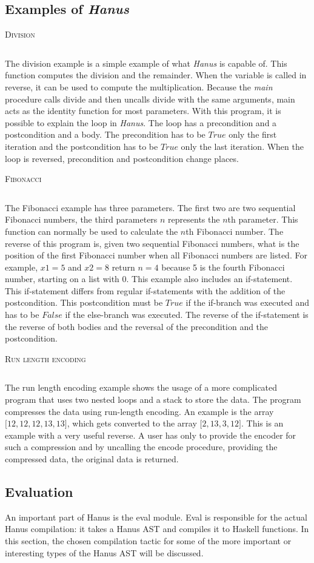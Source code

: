 \documentclass[12pt,a4paper]{article}
\newcommand{\code}[2]{
 \begin{center} \textsc{\small #1} \end{center}
 \inputminted[frame=lines,framesep=.5cm,baselinestretch=.8,linenos,fontsize=\footnotesize]
         {haskell}{code/#2.hs}
}
\begin{document}
\subsection{Examples of \textit{Hanus}}
\code{Division}{divide}
The division example is a simple example of what \textit{Hanus} is capable of. This function computes the division and the remainder. When the variable is called in reverse, it can be used to compute the multiplication. Because the \textit{main} procedure calls divide and then uncalls divide with the same arguments, main acts as the identity function for most parameters. With this program, it is possible to explain the loop in \textit{Hanus}. The loop has a precondition and a postcondition and a body. The precondition has to be $True$ only the first iteration and the postcondition has to be $True$ only the last iteration. When the loop is reversed, precondition and postcondition change places. 
    
\code{Fibonacci}{fibonacci}
The Fibonacci example has three parameters. The first two are two sequential Fibonacci numbers, the third parameters $n$ represents the $n$th parameter. This function can normally be used to calculate the $n$th Fibonacci number. The reverse of this program is, given two sequential Fibonacci numbers, what is the position of the first Fibonacci number when all Fibonacci numbers are listed. For example, $x1 = 5$ and $x2 = 8$ return $n=4$ because 5 is the fourth Fibonacci number, starting on a list with 0. This example also includes an if-statement. This if-statement differs from regular if-statements with the addition of the postcondition. This postcondition must be $True$ if the if-branch was executed and has to be $False$ if the else-branch was executed. The reverse of the if-statement is the reverse of both bodies and the reversal of the precondition and the postcondition.
\code{Run length encoding}{run-length-encoding}
The run length encoding example shows the usage of a more complicated program that uses two nested loops and a stack to store the data. The program compresses the data using run-length encoding. An example is the array $\lbrack 12, 12, 12, 13, 13 \rbrack$, which gets converted to the array $\lbrack 2, 13, 3, 12 \rbrack$. This is an example with a very useful reverse. A user has only to provide the encoder for such a compression and by uncalling the encode procedure, providing the compressed data, the original data is returned.

    \subsection{Evaluation}
        \label{sec-eval}
            An important part of Hanus is the eval module. Eval is responsible for the actual Hanus compilation: it takes a Hanus AST and compiles it to Haskell functions. In this section, the chosen compilation tactic for some of the more important or interesting types of the Hanus AST will be discussed.
\end{document}
